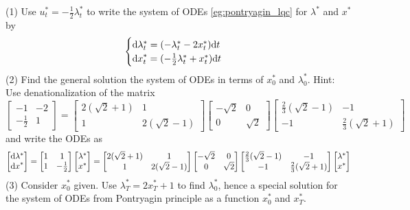 \documentclass[11pt]{book}
\newcommand{\dd}{\text{\normalfont d}}
\newcommand{\dt}{\text{\normalfont d}t}
\newcommand{\dx}{\text{\normalfont d}x}
\begin{document}
\begin{ex}
    (1) Use $u^*_t=-\frac{1}{2}\lambda^*_t$ to write the system of ODEs \eqref{eg:pontryagin_lqc} for $\lambda^*$ and $x^*$ by
    \begin{equation}
        \begin{cases}
        {\dd}\lambda^*_t= (- \lambda^*_t - 2x^*_t){{\dt}}\\
        {\dx}^*_t=( -\frac12\lambda^*_t+x^*_t  ){{\dt}}
        \end{cases}
    \end{equation}
    (2) Find the general solution the system of ODEs in terms of $x^*_0$ and $\lambda^*_0$. Hint: Use denationalization of the matrix 
    \begin{equation}
        \left[
        \begin{matrix}
            -1&-2\\
            -\frac12&1
        \end{matrix}
        \right] =\left[\begin{matrix}2(\sqrt2+1)&1\\1&2(\sqrt2-1)\end{matrix}\right] \left[\begin{matrix}-\sqrt{2}&0\\0&\sqrt{2}\end{matrix}\right] \left[\begin{matrix}\frac23(\sqrt2-1)&-1\\-1&\frac23(\sqrt2+1)\end{matrix}\right]
    \end{equation}
    and write the ODEs as 
    \begin{equation}
        \left[\begin{matrix}{\dd}\lambda^*\\{\dx}^*\end{matrix}\right] = \left[
        \begin{matrix}
            1&1\\
            1&-\frac12
        \end{matrix}
        \right] 
        \left[\begin{matrix}\lambda^*\\x^*\end{matrix}\right] = \left[\begin{matrix}2(\sqrt2+1)&1\\1&2(\sqrt2-1)\end{matrix}\right] \left[\begin{matrix}-\sqrt{2}&0\\0&\sqrt{2}\end{matrix}\right] \left[\begin{matrix}\frac23(\sqrt2-1)&-1\\-1&\frac23(\sqrt2+1)\end{matrix}\right]\left[\begin{matrix}\lambda^*\\x^*\end{matrix}\right]
    \end{equation}
    (3) Consider $x^*_0$ given. Use $\lambda^*_T= 2x^*_T + 1$ to find $\lambda^*_0$, hence a special solution for the system of ODEs from Pontryagin principle as a function $x^*_0$ and $x^*_T$.  
\end{ex}
\end{document}
